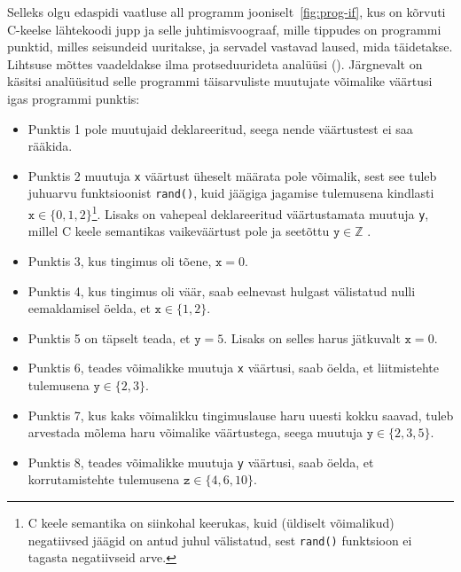 \documentclass[../thesis.tex]{subfiles}
\begin{document}
Selleks olgu edaspidi vaatluse all programm jooniselt~\ref{fig:prog-if}, kus on kõrvuti C-keelse lähtekoodi jupp ja selle juhtimisvoograaf, mille tippudes on programmi punktid, milles seisundeid uuritakse, ja servadel vastavad laused, mida täidetakse. Lihtsuse mõttes vaadeldakse ilma protseduurideta analüüsi ().
Järgnevalt on käsitsi analüüsitud selle programmi täisarvuliste muutujate võimalike väärtusi igas programmi punktis:
\begin{itemize}
	\item Punktis 1 pole muutujaid deklareeritud, seega nende väärtustest ei saa rääkida.
	\item Punktis 2 muutuja \texttt{x} väärtust üheselt määrata pole võimalik, sest see tuleb juhuarvu funktsioonist \texttt{rand()}, kuid jäägiga jagamise tulemusena kindlasti $\texttt{x} \in \{0, 1, 2\}$\footnote{C keele semantika on siinkohal keerukas, kuid (üldiselt võimalikud) negatiivsed jäägid on antud juhul välistatud, sest \texttt{rand()} funktsioon ei tagasta negatiivseid arve.}.
	Lisaks on vahepeal deklareeritud väärtustamata muutuja \texttt{y}, millel C keele semantikas vaikeväärtust pole ja seetõttu $\texttt{y} \in \mathbb{Z}$ \cite{C11_draft}.
	\item Punktis 3, kus tingimus oli tõene, $\texttt{x} = 0$.
	\item Punktis 4, kus tingimus oli väär, saab eelnevast hulgast välistatud nulli eemaldamisel öelda, et $\texttt{x} \in \{1, 2\}$.
	\item Punktis 5 on täpselt teada, et $\texttt{y} = 5$. Lisaks on selles harus jätkuvalt $\texttt{x} = 0$.
	\item Punktis 6, teades võimalikke muutuja \texttt{x} väärtusi, saab öelda, et liitmistehte tulemusena $\texttt{y} \in \{2, 3\}$.
	\item Punktis 7, kus kaks võimalikku tingimuslause haru uuesti kokku saavad, tuleb arvestada mõlema haru võimalike väärtustega, seega muutuja $\texttt{y} \in \{2, 3, 5\}$.
	\item Punktis 8, teades võimalikke muutuja \texttt{y} väärtusi, saab öelda, et korrutamistehte tulemusena $\texttt{z} \in \{4, 6, 10\}$.
\begin{comment}
	\item Punktides 1, 2 ja 3 on muutuja veel väärtustamata. Kuna C keele semantika sellisel juhul mingit vaikeväärtust ei anna, siis võimalikke väärtusi kirjeldab kõige ebatäpsem domeeni element $\top = \mathbb{Z}$.
	\item Punktis 4 on muutujale just antud konstantne väärtus, mistõttu seda kirjeldab kõige paremini element $\{5\}$.


\end{comment}
\end{itemize}
\end{document}
